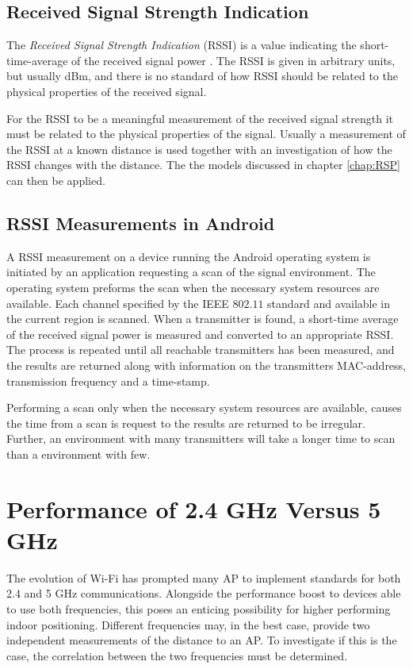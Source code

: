 \documentclass{LTHthesis}
\begin{document}
\subsection{Received Signal Strength Indication}
%
The \emph{Received Signal Strength Indication} (RSSI) is a value indicating the short-time-average of the received signal power \cite{fig_fra10}. The RSSI is given in arbitrary units, but usually dBm, and there is no standard of how RSSI should be related to the physical properties of the received signal. 

For the RSSI to be a meaningful measurement of the received signal strength it must be related to the physical properties of the signal. Usually a measurement of the RSSI at a known distance is used together with an investigation of how the RSSI changes with the distance. The the models discussed in chapter \ref{chap:RSP} can then be applied. 
%

\subsection{RSSI Measurements in Android}

A RSSI measurement on a device running the Android operating system is initiated by an application requesting a scan of the signal environment. The operating system preforms the scan when the necessary system resources are available. Each channel specified by the IEEE $802.11$ standard and available in the current region is scanned. When a transmitter is found, a short-time average of the received signal power is measured and converted to an appropriate RSSI. The process is repeated until all reachable transmitters has been measured, and the results are returned along with information on the transmitters MAC-address, transmission frequency and a time-stamp. 

Performing a scan only when the necessary system resources are available, causes the time from a scan is request to the results are returned to be irregular. Further, an environment with many transmitters will take a longer time to scan than a environment with few.         
%
\section{Performance of 2.4 GHz Versus 5 GHz}
%
The evolution of Wi-Fi has prompted many AP to implement standards for both 2.4 and 5 GHz communications. Alongside the performance boost to devices able to use both frequencies, this poses an enticing possibility for higher performing indoor positioning. Different frequencies may, in the best case, provide two independent measurements of the distance to an AP. To investigate if this is the case, the correlation between the two frequencies must be determined.  
%
\end{document}

